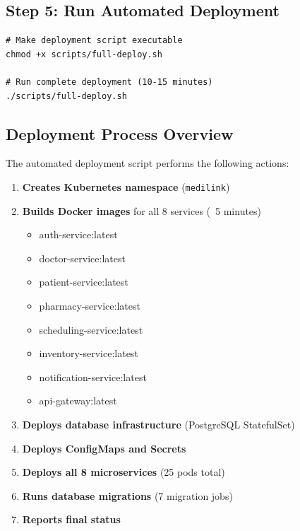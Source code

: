 \documentclass[12pt,a4paper]{article}
\begin{document}
\subsection{Step 5: Run Automated Deployment}
\begin{lstlisting}[style=bash]
# Make deployment script executable
chmod +x scripts/full-deploy.sh

# Run complete deployment (10-15 minutes)
./scripts/full-deploy.sh
\end{lstlisting}

\subsection{Deployment Process Overview}
The automated deployment script performs the following actions:

\begin{enumerate}
    \item \textbf{Creates Kubernetes namespace} (\texttt{medilink})
    \item \textbf{Builds Docker images} for all 8 services (~5 minutes)
    \begin{itemize}
        \item auth-service:latest
        \item doctor-service:latest
        \item patient-service:latest
        \item pharmacy-service:latest
        \item scheduling-service:latest
        \item inventory-service:latest
        \item notification-service:latest
        \item api-gateway:latest
    \end{itemize}
    \item \textbf{Deploys database infrastructure} (PostgreSQL StatefulSet)
    \item \textbf{Deploys ConfigMaps and Secrets}
    \item \textbf{Deploys all 8 microservices} (25 pods total)
    \item \textbf{Runs database migrations} (7 migration jobs)
    \item \textbf{Reports final status}
\end{enumerate}
\end{document}
